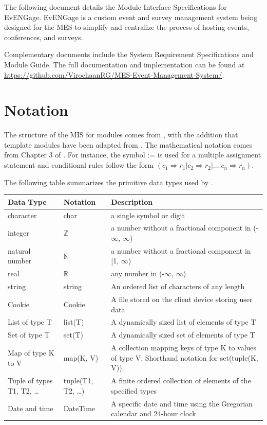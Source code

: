 \documentclass[12pt, titlepage]{article}
\begin{document}
The following document details the Module Interface Specifications for EvENGage.
EvENGage is a custom event and survey management system being designed for the MES to simplify and centralize the process of hosting events, conferences, and surveys.

Complementary documents include the System Requirement Specifications
and Module Guide. The full documentation and implementation can be
found at \url{https://github.com/VirochaanRG/MES-Event-Management-System/}.

\section{Notation}

The structure of the MIS for modules comes from \citet{HoffmanAndStrooper1995},
with the addition that template modules have been adapted from
\cite{GhezziEtAl2003}.  The mathematical notation comes from Chapter 3 of
\citet{HoffmanAndStrooper1995}.  For instance, the symbol := is used for a
multiple assignment statement and conditional rules follow the form $(c_1
\Rightarrow r_1 | c_2 \Rightarrow r_2 | ... | c_n \Rightarrow r_n )$.

The following table summarizes the primitive data types used by \progname.

\begin{center}
\renewcommand{\arraystretch}{1.2}
\noindent
\begin{tabular}{l l p{7.5cm}}
\toprule
\textbf{Data Type} & \textbf{Notation} & \textbf{Description}\\
\midrule
character & char & a single symbol or digit \\
integer & $\mathbb{Z}$ & a number without a fractional component in (-$\infty$, $\infty$) \\
natural number & $\mathbb{N}$ & a number without a fractional component in [1, $\infty$) \\
real & $\mathbb{R}$ & any number in (-$\infty$, $\infty$) \\
string & string & An ordered list of characters of any length \\
Cookie & Cookie & A file stored on the client device storing user data \\
List of type T & list(T) & A dynamically sized list of elements of type T \\
Set of type T & set(T) & A dynamically sized set of elements of type T \\
Map of type K to V & map(K, V) & A collection mapping keys of type K to values of type V. Shorthand notation for set(tuple(K, V)). \\
Tuple of types T1, T2, \dots & tuple(T1, T2, \dots) & A finite ordered collection of elements of the specified types \\
Date and time & DateTime & A specific date and time using the Gregorian calendar and 24-hour clock \\

\bottomrule
\end{tabular}
\end{center}
\end{document}
